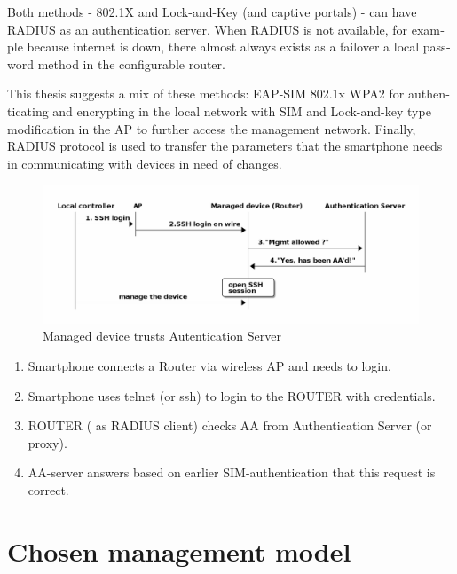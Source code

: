 \documentclass[12pt,a4paper,english]{tutthesis}
\begin{document}
\begin{otherlanguage}{english}
Both methods - 802.1X and Lock-and-Key (and captive portals) - can have RADIUS as an authentication server. 
When RADIUS is not available, for example because internet is down,
there almost always exists as a failover a local password method in the configurable 
router.








This thesis suggests a mix of these methods: EAP-SIM 802.1x WPA2 for
authenticating and encrypting in the local network with SIM and
Lock-and-key type modification in the AP to further access the 
management network. Finally, RADIUS protocol is used to transfer 
the parameters that the smartphone  needs in communicating with 
devices in need of changes.

\begin{figure}[htb]
\centering
\includegraphics[width=.9\linewidth]{trust-register.png}
\caption{\label{fig:trust-register}Managed device trusts Autentication Server}
\end{figure}





\begin{enumerate}
\item Smartphone connects a Router via wireless AP and needs to login.
\item Smartphone uses telnet (or ssh) to login to the ROUTER
with credentials.
\item ROUTER ( as RADIUS client) checks AA from Authentication Server (or 
proxy).
\item AA-server answers based on earlier SIM-authentication that this
request is correct.
\end{enumerate}



\section{Chosen management model}
\label{sec-4-5}






\end{otherlanguage}
\end{document}
